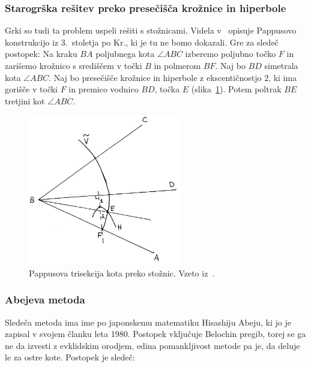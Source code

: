 
\subsubsection*{Starogrška rešitev preko presečišča krožnice in hiperbole}

Grki so tudi ta problem uspeli rešiti s stožnicami. Videla v~\cite[str.\ 6--7]{videla1997} opisuje Pappusovo konstrukcijo iz $3$.\ stoletja po Kr., ki je tu ne bomo dokazali. Gre za sledeč postopek: Na kraku $BA$ poljubnega kota $\angle ABC$ izberemo poljubno točko $F$ in zarišemo krožnico s središčem v točki $B$ in polmerom $BF$. Naj bo $BD$ simetrala kota $\angle ABC$. Naj bo presečišče krožnice in hiperbole z ekscentičnostjo $2$, ki ima gorišče v točki $F$ in premico vodnico $BD$, točka $E$ (slika~\ref{fig:trisection_gr}). Potem poltrak $BE$ tretjini kot $\angle ABC$.

\begin{figure}[h]
    \centering
    \includegraphics[width=0.6\textwidth]{images/starogr_problemi/trisection_grska.png}
    \caption[Pappusova trisekcija kota]{Pappusova trisekcija kota preko stožnic. Vzeto iz~\cite[str.\ 7]{videla1997}.}
    \label{fig:trisection_gr}
\end{figure}

\subsubsection*{Abejeva metoda}

Sledeča metoda ima ime po japonskemu matematiku Hisashiju Abeju, ki jo je zapisal v svojem članku leta 1980. Postopek vključuje Belochin pregib, torej se ga ne da izvesti z evklidskim orodjem, edina pomankljivost metode pa je, da deluje le za ostre kote. Postopek je sledeč:

